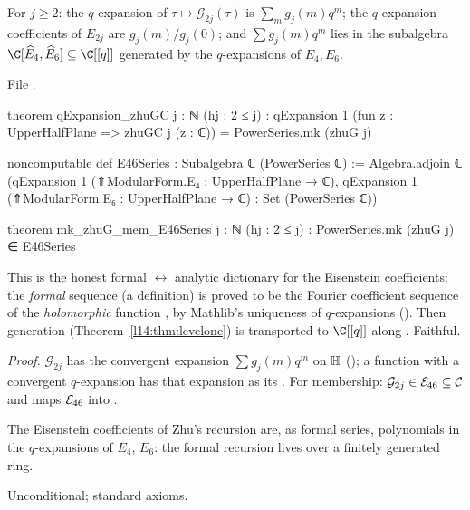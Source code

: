 \begin{theorem}\label{l14:thm:qexpzhuG}
For $j\ge2$: the $q$-expansion of $\tau\mapsto\mathcal G_{2j}(\tau)$ is $\sum_mg_j(m)q^m$; the $q$-expansion coefficients of
$E_{2j}$ are $g_j(m)/g_j(0)$; and $\sum g_j(m)q^m$ lies in the subalgebra $\C[\widehat{E}_4,\widehat{E}_6]\subseteq\C[[q]]$
generated by the $q$-expansions of $E_4,E_6$.
\end{theorem}
\noindent File .
\begin{leancode}
theorem qExpansion_zhuGC {j : ℕ} (hj : 2 ≤ j) :
    qExpansion 1 (fun z : UpperHalfPlane => zhuGC j (z : ℂ)) = PowerSeries.mk (zhuG j)

noncomputable def E46Series : Subalgebra ℂ (PowerSeries ℂ) :=
  Algebra.adjoin ℂ ({qExpansion 1 (⇑ModularForm.E₄ : UpperHalfPlane → ℂ),
    qExpansion 1 (⇑ModularForm.E₆ : UpperHalfPlane → ℂ)} : Set (PowerSeries ℂ))

theorem mk_zhuG_mem_E46Series {j : ℕ} (hj : 2 ≤ j) :
    PowerSeries.mk (zhuG j) ∈ E46Series
\end{leancode}
\begin{dictionary}
This is the honest formal $\leftrightarrow$ analytic dictionary for the Eisenstein coefficients: the \emph{formal} sequence
 (a definition) is proved to be the Fourier coefficient sequence of the \emph{holomorphic} function
, by Mathlib's uniqueness of $q$-expansions (). Then
generation (Theorem~\ref{l14:thm:levelone}) is transported to $\C[[q]]$ along . Faithful.
\end{dictionary}
\noindent\emph{Proof.} $\mathcal G_{2j}$ has the convergent expansion $\sum g_j(m)q^m$ on $\mathbb{H}$
(); a function with a convergent $q$-expansion has that expansion as its . For membership:
$\mathcal G_{2j}\in\mathcal{E}_{46}\subseteq\mathcal C$ and  maps $\mathcal{E}_{46}$ into .
\begin{physics}
The Eisenstein coefficients of Zhu's recursion are, as formal series, polynomials in the $q$-expansions of $E_4$, $E_6$:
the formal recursion lives over a finitely generated ring.
\end{physics}
\begin{status}
Unconditional; standard axioms.
\end{status}


